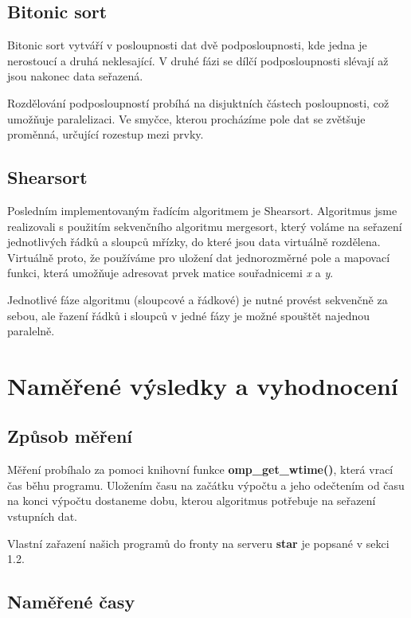 \documentclass[12pt]{article}
\begin{document}
\subsection{Bitonic sort}
Bitonic sort vytváří v posloupnosti dat dvě podposloupnosti, kde jedna je nerostoucí a druhá neklesající.
V druhé fázi se dílčí podposloupnosti slévají až jsou nakonec data seřazená.

Rozdělování podposloupností probíhá na disjuktních částech posloupnosti, což umožňuje paralelizaci.
Ve smyčce, kterou procházíme pole dat se zvětšuje proměnná, určující rozestup mezi prvky.

\subsection{Shearsort}
Posledním implementovaným řadícím algoritmem je Shearsort. Algoritmus jsme realizovali 
s použitím sekvenčního algoritmu mergesort, který voláme na seřazení jednotlivých řádků a sloupců
mřízky, do které jsou data virtuálně rozdělena. Virtuálně proto, že používáme pro uložení dat jednorozměrné
pole a mapovací funkci, která umožňuje adresovat prvek matice souřadnicemi \emph{x} a \emph{y}.

Jednotlivé fáze algoritmu (sloupcové a řádkové) je nutné provést sekvenčně za sebou,
ale řazení řádků i sloupců v jedné fázy je možné spouštět najednou paralelně.

\section{Naměřené výsledky a vyhodnocení}
\subsection{Způsob měření}
Měření probíhalo za pomoci knihovní funkce \textbf{omp\_get\_wtime()}, která vrací čas běhu programu.
Uložením času na začátku výpočtu a jeho odečtením od času na konci výpočtu dostaneme dobu, kterou
algoritmus potřebuje na seřazení vstupních dat.

Vlastní zařazení našich programů do fronty na serveru \textbf{star} je popsané v sekci 1.2.

\subsection{Naměřené časy}
\end{document}
